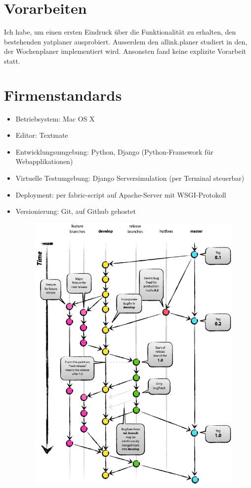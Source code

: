 \section{Vorarbeiten}
Ich habe, um einen ersten Eindruck über die Funktionalität zu erhalten, den bestehenden yatplaner ausprobiert.
Ausserdem den allink.planer studiert in den, der Wochenplaner implementiert wird.
Ansonsten fand keine explizite Vorarbeit statt.

\section{Firmenstandards}
\begin{itemize}
    \item Betriebsystem: Mac OS X
    \item Editor: Textmate
    \item Entwicklungsumgebung: Python, Django (Python-Framework für Webapplikationen)
    \item Virtuelle Testumgebung: Django Serversimulation (per Terminal steuerbar)
    \item Deployment: per fabric-script auf Apache-Server mit WSGI-Protokoll
    \item Versionierung: Git, auf Github gehostet
    \begin{figure}[!ht]
    \begin{center}
    \includegraphics[width=0.99\textwidth,angle=0]{./bilder/git.png}
    \caption[“A successful Git branching model” von Vincent Driessen]
    \label{“A successful Git branching model” von Vincent Driessen}
    \end{center}
    \end{figure}
\end{itemize}

